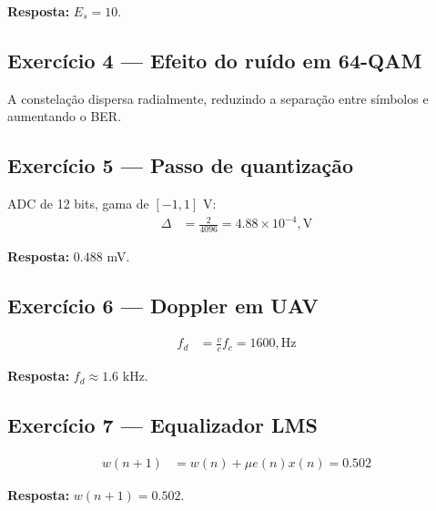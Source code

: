 \documentclass[12pt,a4paper]{article} \usepackage[utf8]{inputenc}
\begin{document}
\textbf{Resposta:} $E_s = 10$.

\subsection{Exercício 4 — Efeito do ruído em 64-QAM} A constelação dispersa radialmente, reduzindo a separação entre símbolos e aumentando o BER.


\subsection{Exercício 5 — Passo de quantização} ADC de 12 bits, gama de $[-1,1]$ V: \begin{align*} \Delta &= \frac{2}{4096} = 4.88 \times 10^{-4},\text{V} \end{align*}

\textbf{Resposta:} $0.488$ mV.

\subsection{Exercício 6 — Doppler em UAV} \begin{align*} f_d &= \frac{v}{c} f_c = 1600,\text{Hz} \end{align*}

\textbf{Resposta:} $f_d \approx 1.6$ kHz.


\subsection{Exercício 7 — Equalizador LMS} \begin{align*} w(n+1) &= w(n) + \mu e(n)x(n) = 0.502 \end{align*}

\textbf{Resposta:} $w(n+1)=0.502$.
\end{document}
